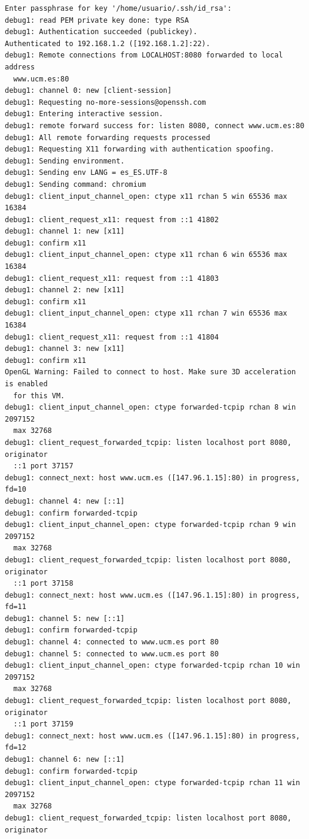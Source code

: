 \documentclass[11pt]{article}
\begin{document}
\begin{lstlisting}
Enter passphrase for key '/home/usuario/.ssh/id_rsa':
debug1: read PEM private key done: type RSA
debug1: Authentication succeeded (publickey).
Authenticated to 192.168.1.2 ([192.168.1.2]:22).
debug1: Remote connections from LOCALHOST:8080 forwarded to local address
  www.ucm.es:80
debug1: channel 0: new [client-session]
debug1: Requesting no-more-sessions@openssh.com
debug1: Entering interactive session.
debug1: remote forward success for: listen 8080, connect www.ucm.es:80
debug1: All remote forwarding requests processed
debug1: Requesting X11 forwarding with authentication spoofing.
debug1: Sending environment.
debug1: Sending env LANG = es_ES.UTF-8
debug1: Sending command: chromium
debug1: client_input_channel_open: ctype x11 rchan 5 win 65536 max 16384
debug1: client_request_x11: request from ::1 41802
debug1: channel 1: new [x11]
debug1: confirm x11
debug1: client_input_channel_open: ctype x11 rchan 6 win 65536 max 16384
debug1: client_request_x11: request from ::1 41803
debug1: channel 2: new [x11]
debug1: confirm x11
debug1: client_input_channel_open: ctype x11 rchan 7 win 65536 max 16384
debug1: client_request_x11: request from ::1 41804
debug1: channel 3: new [x11]
debug1: confirm x11
OpenGL Warning: Failed to connect to host. Make sure 3D acceleration is enabled
  for this VM.
debug1: client_input_channel_open: ctype forwarded-tcpip rchan 8 win 2097152
  max 32768
debug1: client_request_forwarded_tcpip: listen localhost port 8080, originator
  ::1 port 37157
debug1: connect_next: host www.ucm.es ([147.96.1.15]:80) in progress, fd=10
debug1: channel 4: new [::1]
debug1: confirm forwarded-tcpip
debug1: client_input_channel_open: ctype forwarded-tcpip rchan 9 win 2097152
  max 32768
debug1: client_request_forwarded_tcpip: listen localhost port 8080, originator
  ::1 port 37158
debug1: connect_next: host www.ucm.es ([147.96.1.15]:80) in progress, fd=11
debug1: channel 5: new [::1]
debug1: confirm forwarded-tcpip
debug1: channel 4: connected to www.ucm.es port 80
debug1: channel 5: connected to www.ucm.es port 80
debug1: client_input_channel_open: ctype forwarded-tcpip rchan 10 win 2097152
  max 32768
debug1: client_request_forwarded_tcpip: listen localhost port 8080, originator
  ::1 port 37159
debug1: connect_next: host www.ucm.es ([147.96.1.15]:80) in progress, fd=12
debug1: channel 6: new [::1]
debug1: confirm forwarded-tcpip
debug1: client_input_channel_open: ctype forwarded-tcpip rchan 11 win 2097152
  max 32768
debug1: client_request_forwarded_tcpip: listen localhost port 8080, originator

\end{lstlisting}
\end{document}
